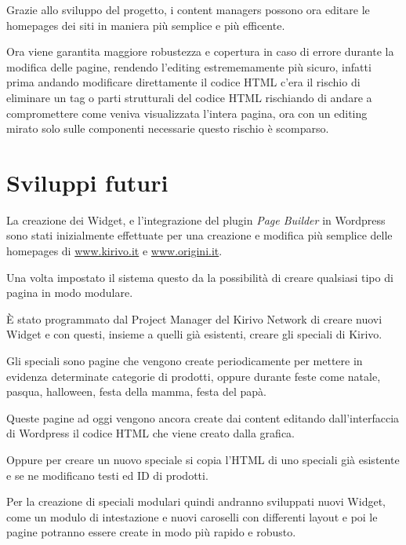
Grazie allo sviluppo del progetto, i content managers possono ora editare le
homepages dei siti in maniera più semplice e più efficente.

Ora viene garantita maggiore robustezza e copertura in caso di errore durante la modifica delle pagine,
rendendo l'editing estrememamente più sicuro, infatti prima andando modificare direttamente il codice HTML c'era il rischio di eliminare
un tag o parti strutturali del codice HTML rischiando di andare a compromettere come veniva visualizzata l'intera pagina,
ora con un editing mirato solo sulle componenti necessarie questo rischio è scomparso.

\section{Sviluppi futuri}

La creazione dei Widget, e l'integrazione del plugin \emph{Page Builder} in Wordpress sono stati
inizialmente effettuate per una creazione e modifica più semplice delle homepages di \url{www.kirivo.it} 
e \url{www.origini.it}.

Una volta impostato il sistema questo da la possibilità di creare qualsiasi tipo di pagina in modo modulare.

È stato programmato dal Project Manager del Kirivo Network di creare nuovi Widget e con questi, insieme a quelli 
già esistenti, creare gli speciali di Kirivo.

Gli speciali sono pagine che vengono create periodicamente per mettere in evidenza determinate categorie di prodotti,
oppure durante feste come natale, pasqua, halloween, festa della mamma, festa del papà.

Queste pagine ad oggi vengono ancora create dai content editando dall'interfaccia di Wordpress il codice HTML che
viene creato dalla grafica.

Oppure per creare un nuovo speciale si copia l'HTML di uno speciali già esistente e se ne modificano testi
ed ID di prodotti.

Per la creazione di speciali modulari quindi andranno sviluppati nuovi Widget, come un modulo di intestazione
e nuovi caroselli con differenti layout e poi le pagine potranno essere create in modo più rapido
e robusto.
